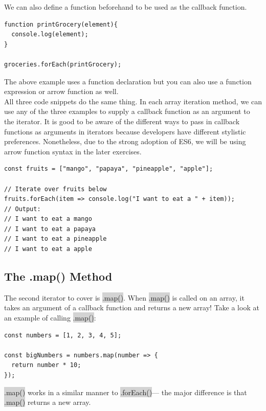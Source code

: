 \documentclass[11pt]{article}
\begin{document}
We can also define a function beforehand to be used as the callback function.
\begin{lstlisting}
function printGrocery(element){
  console.log(element);
}

groceries.forEach(printGrocery);
\end{lstlisting}
The above example uses a function declaration but you can also use a function expression or arrow function as well. \\
\newline
All three code snippets do the same thing. In each array iteration method, we can use any of the three examples to supply a callback function as an argument to the iterator. It is good to be aware of the different ways to pass in callback functions as arguments in iterators because developers have different stylistic preferences. Nonetheless, due to the strong adoption of ES6, we will be using arrow function syntax in the later exercises.
\begin{lstlisting}
const fruits = ["mango", "papaya", "pineapple", "apple"];

// Iterate over fruits below
fruits.forEach(item => console.log("I want to eat a " + item));
// Output: 
// I want to eat a mango
// I want to eat a papaya
// I want to eat a pineapple
// I want to eat a apple
\end{lstlisting}



\subsection{The .map() Method} 
The second iterator to cover is \colorbox{lightgray}{.map()}. When \colorbox{lightgray}{.map()} is called on an array, it takes an argument of a callback function and returns a new array! Take a look at an example of calling \colorbox{lightgray}{.map()}:
\begin{lstlisting}
const numbers = [1, 2, 3, 4, 5]; 

const bigNumbers = numbers.map(number => {
  return number * 10;
});
\end{lstlisting}
\colorbox{lightgray}{.map()} works in a similar manner to \colorbox{lightgray}{.forEach()}— the major difference is that \colorbox{lightgray}{.map()} returns a new array.
\end{document}
